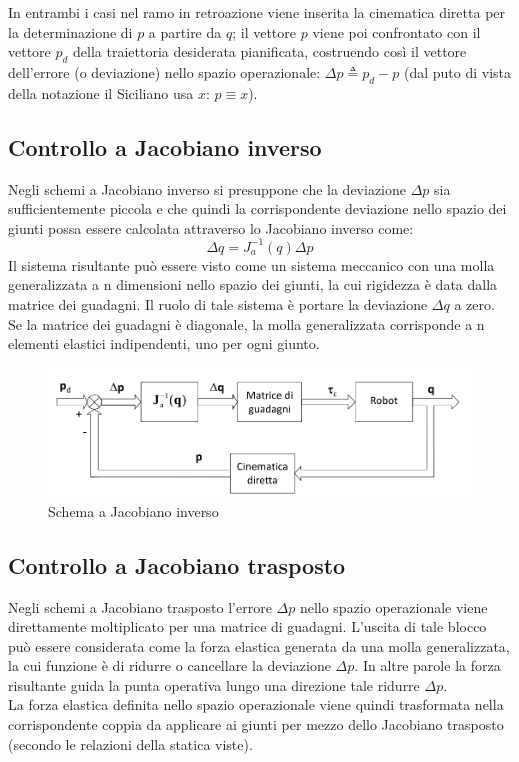 \boldmath
In entrambi i casi nel ramo in retroazione viene inserita la cinematica diretta per la determinazione di $p$ a partire da $q$; il vettore $p$ viene poi confrontato con il vettore $p_d$ della traiettoria desiderata pianificata, costruendo così il vettore dell’errore (o deviazione) nello spazio operazionale: $\Delta p \triangleq p_d - p$ (dal puto di vista della notazione il Siciliano usa $x$: $p \equiv x$).






\subsection{Controllo a Jacobiano inverso}
Negli schemi a Jacobiano inverso si presuppone che la deviazione $\Delta p$ sia sufficientemente piccola e che quindi la corrispondente deviazione nello spazio dei giunti possa essere calcolata attraverso lo Jacobiano inverso come:
$$
\Delta q = J_a^{-1}(q) \Delta p
$$
Il sistema risultante può essere visto come un sistema meccanico con una molla generalizzata a n dimensioni nello spazio dei giunti, la cui rigidezza è data dalla matrice dei guadagni. Il ruolo di tale sistema è portare la deviazione $\Delta q$ a zero. Se la matrice dei guadagni è diagonale, la molla generalizzata corrisponde a n elementi elastici indipendenti, uno per ogni giunto.

\begin{figure}[H]
	\centering
	\includegraphics[width=0.7\linewidth]{images/operational_space_control_inv_jac}
	\caption{Schema a Jacobiano inverso}
	\label{fig:operationalspacecontrolinvjac}
\end{figure}







\subsection{Controllo a Jacobiano trasposto}
Negli schemi a Jacobiano trasposto l’errore $\Delta p$ nello spazio operazionale viene direttamente moltiplicato per una matrice di guadagni.
L’uscita di tale blocco può essere considerata come la forza elastica generata da una molla generalizzata, la cui funzione è di ridurre o cancellare la deviazione $\Delta p$. In altre parole la forza risultante guida la punta operativa lungo una direzione tale ridurre $\Delta p$.\\
La forza elastica definita nello spazio operazionale viene quindi trasformata nella corrispondente coppia da applicare ai giunti per mezzo dello Jacobiano trasposto (secondo le relazioni della statica viste).

